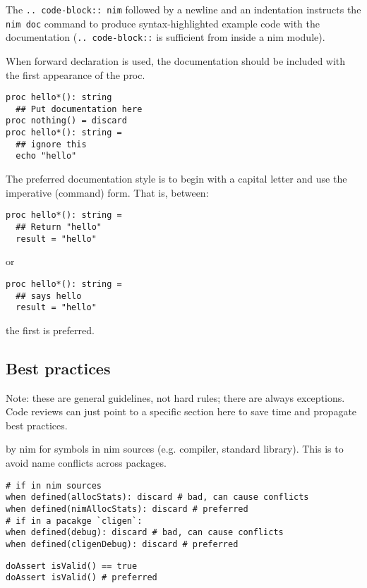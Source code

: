 The \texttt{..\ code-block::\ nim} followed by a newline and an
indentation instructs the \texttt{nim\ doc} command to produce
syntax-highlighted example code with the documentation
(\texttt{..\ code-block::} is sufficient from inside a nim module).

When forward declaration is used, the documentation should be included
with the first appearance of the proc.

\begin{verbatim}
proc hello*(): string
  ## Put documentation here
proc nothing() = discard
proc hello*(): string =
  ## ignore this
  echo "hello"
\end{verbatim}

The preferred documentation style is to begin with a capital letter and
use the imperative (command) form. That is, between:

\begin{verbatim}
proc hello*(): string =
  ## Return "hello"
  result = "hello"
\end{verbatim}

or

\begin{verbatim}
proc hello*(): string =
  ## says hello
  result = "hello"
\end{verbatim}

the first is preferred.

\hypertarget{best-practices}{%
\subsection{Best practices}\label{best-practices}}

Note: these are general guidelines, not hard rules; there are always
exceptions. Code reviews can just point to a specific section here to
save time and propagate best practices.

by {nim} for symbols in nim sources (e.g. compiler, standard library).
This is to avoid name conflicts across packages.

\begin{verbatim}
# if in nim sources
when defined(allocStats): discard # bad, can cause conflicts
when defined(nimAllocStats): discard # preferred
# if in a pacakge `cligen`:
when defined(debug): discard # bad, can cause conflicts
when defined(cligenDebug): discard # preferred
\end{verbatim}

\begin{verbatim}
doAssert isValid() == true
doAssert isValid() # preferred
\end{verbatim}

